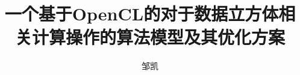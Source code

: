 \documentclass[bachelor]{ustcthesis}
\title{一个基于OpenCL的对于数据立方体相关计算操作的算法模型及其优化方案}
\author{邹凯}
\begin{document}
\maketitle

%
%
%

\frontmatter

\tableofcontents

\listoffigures
\listoftables
\listofalgorithms  %
% 

\mainmatter










\backmatter
% 
% 
% 
% 
% 
% 
% 
% 
\end{document}
